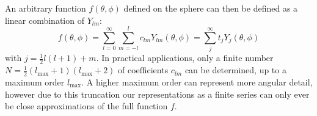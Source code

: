 An arbitrary function $f(\theta,\phi)$ defined on the sphere can then be defined as a linear combination of $Y_{lm}$:
\begin{equation}
  f(\theta,\phi) = \sum_{l=0}^{\infty}\sum_{m=-l}^{l} c_{lm}Y_{lm}(\theta,\phi) = \sum_j^{\infty} t_jY_j(\theta, \phi) \label{eq:shfun}
\end{equation}
with $j = \frac{1}{2}l(l+1) + m$.
In practical applications, only a finite number $N = \frac{1}{2}(l_{\text{max}}+1)(l_{\text{max}}+2)$ of coefficients $c_{lm}$ can be determined, up to a maximum order $l_{\text{max}}$.
A higher maximum order can represent more angular detail, however due to this truncation our representations as a finite series can only ever be close approximations of the full function $f$.
